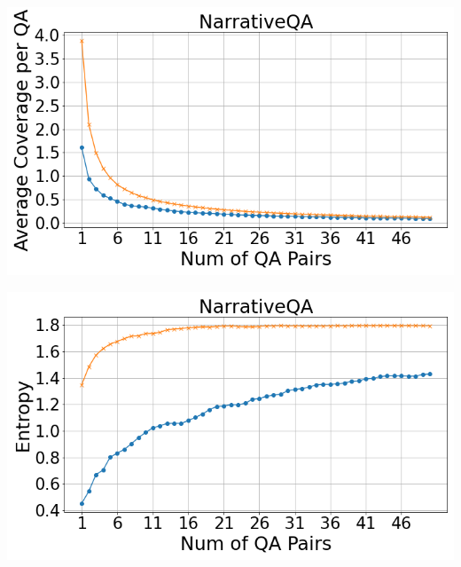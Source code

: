 \documentclass[11pt]{article}
\begin{document}
\begin{minipage}{0.33\textwidth}
    \includegraphics[width=\linewidth]{submissions/Tung2023/figs/NarrativeQA_Average Coverage per QA.png}
    \label{fig:narrativeqa-avg-cov-per-qa}
\end{minipage}%
\begin{minipage}{0.33\textwidth}
    \includegraphics[width=\linewidth]{submissions/Tung2023/figs/NarrativeQA_Entropy.png}
    \label{fig:narrativeqa-entropy}
\end{minipage}
\end{document}
